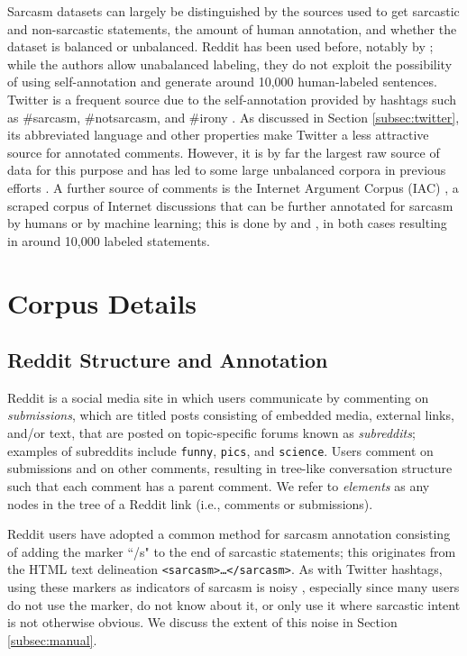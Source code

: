 \documentclass[10pt, a4paper]{article}
\begin{document}
Sarcasm datasets can largely be distinguished by the sources used to get sarcastic and non-sarcastic statements, the amount of human annotation, and whether the dataset is balanced or unbalanced.
Reddit has been used before, notably by ; 
while the authors allow unabalanced labeling, they do not exploit the possibility of using self-annotation and generate around 10,000 human-labeled sentences.
Twitter is a frequent source due to the self-annotation provided by hashtags such as \#sarcasm, \#notsarcasm, and \#irony \cite{Reyes:13,Bamman:15,Joshi:15}.
As discussed in Section \ref{subsec:twitter}, its abbreviated language and other properties make Twitter a less attractive source for annotated comments.
However, it is by far the largest raw source of data for this purpose and has led to some large unbalanced corpora in previous efforts \cite{Riloff:13,Ptacek:14}.
A further source of comments is the Internet Argument Corpus (IAC) \cite{Walker:12}, a scraped corpus of Internet discussions that can be further annotated for sarcasm by humans or by machine learning; 
this is done by  and , in both cases resulting in around 10,000 labeled statements. 


\section{Corpus Details}
\label{sec:details}
\subsection{Reddit Structure and Annotation}
\label{subsec:reddit}

Reddit is a social media site in which users communicate by commenting on {\em submissions}, which are titled posts consisting of embedded media, external links, and/or text, that are posted on topic-specific forums known as {\em subreddits}; examples of subreddits include \texttt{funny}, \texttt{pics}, and \texttt{science}.
Users comment on submissions and on other comments, resulting in tree-like conversation structure such that each comment has a parent comment. 
We refer to {\em elements} as any nodes in the tree of a Reddit link (i.e., comments or submissions). 

Reddit users have adopted a common method for sarcasm annotation consisting of adding the marker ``/s" to the end of sarcastic statements; 
this originates from the HTML text delineation \texttt{<sarcasm>\dots</sarcasm>}.
As with Twitter hashtags, using these markers as indicators of sarcasm is noisy  \cite{Bamman:15}, especially since many users do not use the marker, do not know about it, or only use it where sarcastic intent is not otherwise obvious.
We discuss the extent of this noise in Section \ref{subsec:manual}.
\end{document}
